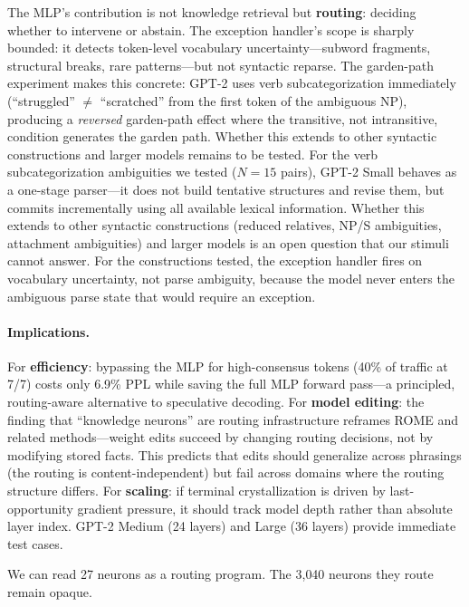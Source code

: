 \documentclass{article}
\begin{document}
The MLP's contribution is not knowledge retrieval but \textbf{routing}:
deciding whether to intervene or abstain.
The exception handler's scope is sharply bounded:
it detects token-level vocabulary uncertainty---subword fragments,
structural breaks, rare patterns---but not syntactic reparse.
The garden-path experiment makes this concrete: GPT-2 uses verb
subcategorization immediately (``struggled'' $\neq$ ``scratched'' from the
first token of the ambiguous NP), producing a \emph{reversed} garden-path
effect where the transitive, not intransitive, condition generates the garden
path.
Whether this extends to other syntactic constructions and larger models remains
to be tested.
For the verb subcategorization ambiguities we tested ($N = 15$ pairs),
GPT-2 Small behaves as a one-stage parser---it does not build tentative
structures and revise them, but commits incrementally using all available
lexical information.
Whether this extends to other syntactic constructions (reduced relatives,
NP/S ambiguities, attachment ambiguities) and larger models is an open
question that our stimuli cannot answer.
For the constructions tested, the exception handler fires on vocabulary
uncertainty, not parse ambiguity, because the model never enters the ambiguous
parse state that would require an exception.

\paragraph{Implications.}
For \textbf{efficiency}: bypassing the MLP for high-consensus tokens
(40\% of traffic at 7/7) costs only 6.9\% PPL while saving the full
MLP forward pass---a principled, routing-aware alternative to speculative
decoding.
For \textbf{model editing}: the finding that ``knowledge neurons'' are routing
infrastructure reframes ROME and related methods---weight edits succeed by
changing routing decisions, not by modifying stored facts.
This predicts that edits should generalize across phrasings (the routing
is content-independent) but fail across domains where the routing structure
differs.
For \textbf{scaling}: if terminal crystallization is driven by last-opportunity
gradient pressure, it should track model depth rather than absolute layer index.
GPT-2 Medium (24 layers) and Large (36 layers) provide immediate test cases.

We can read 27 neurons as a routing program.
The 3{,}040 neurons they route remain opaque.



\end{document}
